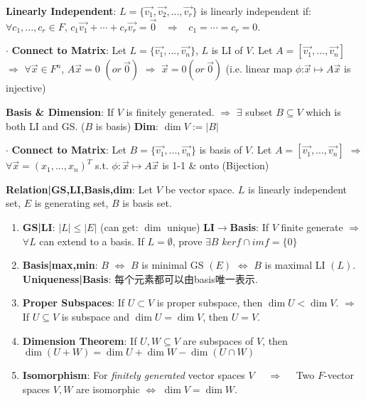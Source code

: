 \documentclass[9pt]{article}
\begin{document}
\textbf{Linearly Independent}: $L=\{\vec{v_1},\vec{v_2},...,\vec{v_r}\}$ is linearly independent if: \ $\forall c_1,...,c_r\in F$, $c_1\vec{v_1}+\cdots+c_r\vec{v_r}=\vec{0}$ \ $\Rightarrow$ \ $c_1=\cdots =c_r=0$.

$\cdot$ \textbf{Connect to Matrix}: {\footnotesize Let $L=\{\vec{v_1},...,\vec{v_n}\}$, $L$ is LI of $V$. Let $A=[\vec{v_1},...,\vec{v_n}]$ $\Rightarrow$ $\forall\vec{x}\in F^n$, $A\vec{x}=0$ $(or \ \vec{0})$ $\Rightarrow$ $\vec{x}=0 (or \ \vec{0})$ (i.e. linear map $\phi$:$\vec{x}\mapsto A\vec{x}$ is injective)}

\textbf{Basis \& Dimension}: If $V$ is finitely generated. $\Rightarrow$ $\exists$ subset $B\subseteq V$ which is both LI and GS. ($B$ is basis) \quad \textbf{Dim}: $\dim V:=|B|$

$\cdot$ \textbf{Connect to Matrix}: {\footnotesize Let $B=\{\vec{v_1},...,\vec{v_n}\}$ is basis of $V$. Let $A=[\vec{v_1},...,\vec{v_n}]$ $\Rightarrow$ $\forall\vec{x}=(x_1,...,x_n)^T$ s.t. $\phi:\vec{x}\mapsto A\vec{x}$ is 1-1 \& onto (Bijection)}

\textbf{Relation|GS,LI,Basis,dim}: {\small Let $V$ be vector space. $L$ is linearly independent set, $E$ is generating set, $B$ is basis set.}

\begin{enumerate}[itemsep=-2pt, topsep=-2pt]
    \item \textbf{GS|LI}: $|L|\leq|E|$ {\scriptsize (can get: $\dim$ unique)} \quad \textbf{LI$\to$Basis}: If $V$ finite generate $\Rightarrow$ $\forall L$ can extend to a basis. {\scriptsize If $L=\emptyset$, prove $\exists B$} \quad \quad $ker f\cap im f=\{0\}$
    \item \textbf{Basis|max,min}: $B$ $\Leftrightarrow$ $B$ is minimal GS $(E)$ $\Leftrightarrow$ $B$ is maximal LI $(L)$. \quad \textbf{Uniqueness|Basis}: {\small 每个元素都可以由basis唯一表示.}
    \item \textbf{Proper Subspaces}: {\small If $U\subset V$ is proper subspace, then $\dim U<\dim V$. \quad $\Rightarrow$ \quad If $U\subseteq V$ is subspace and $\dim U=\dim V$, then $U=V$.}
    \item \textbf{Dimension Theorem}: If $U,W\subseteq V$ are subspaces of $V$, then $\dim(U+W)=\dim U+\dim W-\dim(U\cap W)$ 
    \item \textbf{Isomorphism}: For \textit{finitely generated} vector spaces $V$ \ \ $\Rightarrow$ \ \ Two $F$-vector spaces $V,W$ are isomorphic $\Leftrightarrow$ $\dim V=\dim W$.
\end{enumerate}
\end{document}
